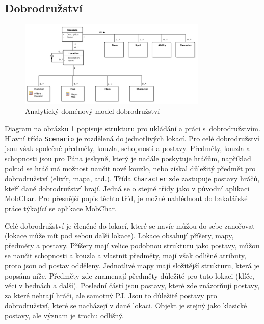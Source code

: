 \documentclass[thesis=B,czech]{resources/FITthesis}[2012/06/26]
\begin{document}
\subsection{Dobrodružství}
\begin{figure}\centering
	\includegraphics[width=0.8\textwidth]{images/domain_scenario}
	\caption[Analytický doménový model dobrodružství]{Analytický doménový model dobrodružství}\label{fig:dm_scenario}
\end{figure}
Diagram na obrázku \ref{fig:dm_scenario} popisuje strukturu pro ukládání a práci s~dobrodružstvím. Hlavní třída \texttt{Scenario} je rozdělená do jednotlivých lokací. Pro celé dobrodružství jsou však společné předměty, kouzla, schopnosti a postavy. Předměty, kouzla a schopnosti jsou pro Pána jeskyně, který je nadále poskytuje hráčům, například pokud se hráč má možnost naučit nové kouzlo, nebo získal důležitý předmět pro dobrodružství (elixír, mapa, atd.). Třída \texttt{Character} zde zastupuje postavy hráčů, kteří dané dobrodružství hrají. Jedná se o stejné třídy jako v původní aplikaci MobChar. Pro přesnější popis těchto tříd, je možné nahlédnout do bakalářské práce týkající se aplikace MobChar\cite{Weberova_2017}.\par

Celé dobrodružství je členěné do lokací, které se navíc můžou do sebe zanořovat (lokace může mít pod sebou další lokace). Lokace obsahují příšery, mapy, předměty a postavy. Příšery mají velice podobnou strukturu jako postavy, můžou se naučit schopnosti a kouzla a vlastnit předměty, mají však odlišné atributy, proto jsou od postav odděleny. Jednotlivé mapy mají složitější strukturu, která je popsána níže. Předměty zde znamenají předměty důležité pro tuto lokaci (klíče, věci v bednách a další). Poslední částí jsou postavy, které zde znázorňují postavy, za které nehrají hráči, ale samotný PJ. Jsou to důležité postavy pro dobrodružství, které se nacházejí v dané lokaci. Objekt je stejný jako klasické postavy, ale význam je trochu odlišný.
\end{document}
